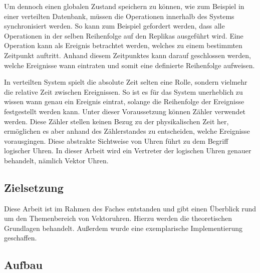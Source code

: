 Um dennoch einen globalen Zustand speichern zu können, wie zum Beispiel in einer verteilten Datenbank, müssen die Operationen innerhalb des Systems synchronisiert werden. So kann zum Beispiel gefordert werden, dass alle Operationen in der selben Reihenfolge auf den Replikas ausgeführt wird. Eine Operation kann als Ereignis betrachtet werden, welches zu einem bestimmten Zeitpunkt auftritt. Anhand diesem Zeitpunktes kann darauf geschlossen werden, welche Ereignisse wann eintraten und somit eine definierte Reihenfolge aufweisen.

In verteilten System spielt die absolute Zeit selten eine Rolle, sondern vielmehr die relative Zeit zwischen Ereignissen.
So ist es für das System unerheblich zu wissen wann genau ein Ereignis eintrat, solange die Reihenfolge der Ereignisse festgestellt werden kann. Unter dieser Voraussetzung können Zähler verwendet werden. Diese Zähler stellen keinen Bezug zu der physikalischen Zeit her, ermöglichen es aber anhand des Zählerstandes zu entscheiden, welche Ereignisse vorausgingen.
Diese abstrakte Sichtweise von Uhren führt zu dem Begriff logischer Uhren. In dieser Arbeit wird ein Vertreter der logischen Uhren genauer behandelt, nämlich Vektor Uhren.

\subsection{Zielsetzung}
Diese Arbeit ist im Rahmen des Faches  entstanden und gibt einen Überblick rund um den Themenbereich von Vektoruhren.
Hierzu werden die theoretischen Grundlagen behandelt.
Außerdem wurde eine exemplarische Implementierung geschaffen.
\subsection{Aufbau}

    
  
